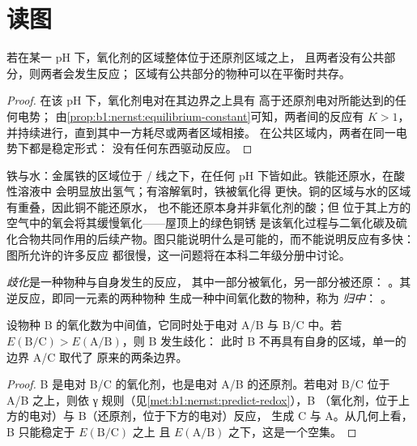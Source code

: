 \section{读图}\label{sec:b1:e-ph-diagrams:reading}

\begin{proposition}[不相交区域]\label{prop:b1:e-ph-diagrams:disjoint-domains}
若在某一 pH 下，氧化剂的区域整体位于还原剂区域之上，
且两者没有公共部分，则两者会发生反应；
区域有公共部分的物种可以在平衡时共存。
\end{proposition}

\begin{proof}
在该 pH 下，氧化剂电对在其边界之上具有
高于还原剂电对所能达到的任何电势；
由\cref{prop:b1:nernst:equilibrium-constant}可知，两者间的反应有 $K > 1$，
并持续进行，直到其中一方耗尽或两者区域相接。
在公共区域内，两者在同一电势下都是稳定形式：
没有任何东西驱动反应。
\end{proof}

铁与水：金属铁的区域位于
/ 线之下，在任何 pH 下皆如此。铁能还原水，在酸性溶液中
会明显放出氢气；有溶解氧时，铁被氧化得
更快。铜的区域与水的区域有重叠，因此铜不能还原水，
也不能还原本身并非氧化剂的酸；但
位于其上方的空气中的氧会将其缓慢氧化——屋顶上的绿色铜锈
是该氧化过程与二氧化碳及硫
化合物共同作用的后续产物。图只能说明什么是可能的，而不能说明反应有多快：图所允许的许多反应
都很慢，这一问题将在本科二年级分册中讨论。

\begin{definition}[歧化、归中]\label{def:b1:e-ph-diagrams:disproportionation}
\emph{歧化}是一种物种与自身发生的反应，
其中一部分被氧化，另一部分被还原：
。其逆反应，即同一元素的两种物种
生成一种中间氧化数的物种，称为
\emph{归中}：
。
\end{definition}

\begin{proposition}[歧化判据]\label{prop:b1:e-ph-diagrams:disproportionation-criterion}
设物种 B 的氧化数为中间值，它同时处于电对 A/B 与
B/C 中。若 $E(\mathrm{B}/\mathrm{C}) > E(\mathrm{A}/\mathrm{B})$，则 B 发生歧化：
此时 B 不再具有自身的区域，单一的边界 A/C 取代了
原来的两条边界。
\end{proposition}

\begin{proof}
B 是电对 B/C 的氧化剂，也是电对 A/B 的还原剂。若电对 B/C 位于
A/B 之上，则依 γ 规则（见\cref{met:b1:nernst:predict-redox}），B
（氧化剂，位于上方的电对）与 B（还原剂，位于下方的电对）反应，
生成 C 与 A。从几何上看，B 只能稳定于 $E(\mathrm{B}/\mathrm{C})$ 之上
且 $E(\mathrm{A}/\mathrm{B})$ 之下，这是一个空集。
\end{proof}

